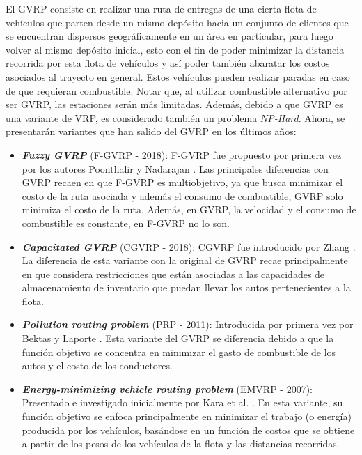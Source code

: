 \documentclass[letter, 10pt]{article}
\begin{document}
El GVRP consiste en realizar una ruta de entregas de una cierta flota de vehículos que parten desde un mismo depósito hacia un conjunto de clientes que se encuentran dispersos geográficamente en un área en particular, para luego volver al mismo depósito inicial, esto con el fin de poder minimizar la distancia recorrida por esta flota de vehículos y así poder también abaratar los costos asociados al trayecto en general. Estos vehículos pueden realizar paradas en caso de que requieran combustible. Notar que, al utilizar combustible alternativo por ser GVRP, las estaciones serán más limitadas. Además, debido a que GVRP es una variante de VRP, es considerado también un problema \emph{NP-Hard}. Ahora, se presentarán variantes que han salido del GVRP en los últimos años:\\
\begin{itemize}
    \item \textbf{\emph{Fuzzy GVRP}} (F-GVRP - 2018): F-GVRP fue propuesto por primera vez por los autores Poonthalir y Nadarajan \cite{FGVRP}. Las principales diferencias con GVRP recaen en que F-GVRP es multiobjetivo, ya que busca minimizar el costo de la ruta asociada y además el consumo de combustible, GVRP solo minimiza el costo de la ruta. Además, en GVRP, la velocidad y el consumo de combustible es constante, en F-GVRP no lo son.

    \item \textbf{\emph{Capacitated GVRP}} (CGVRP - 2018): CGVRP fue introducido por Zhang \cite{CGVRP}. La diferencia de esta variante con la original de GVRP recae principalmente en que considera restricciones que están asociadas a las capacidades de almacenamiento de inventario que puedan llevar los autos pertenecientes a la flota.
    
    \item \textbf{\emph{Pollution routing problem}} (PRP - 2011): Introducida por primera vez por Bektas y Laporte \cite{PRP}. Esta variante del GVRP se diferencia debido a que la función objetivo se concentra en minimizar el gasto de combustible de los autos y el costo de los conductores. 
    
    \item \textbf{\emph{Energy-minimizing vehicle routing problem}} (EMVRP - 2007): Presentado e investigado inicialmente por Kara et al. \cite{EMVRP}. En esta variante, su función objetivo se enfoca principalmente en minimizar el trabajo (o energía) producida por los vehículos, basándose en un función de costos que se obtiene a partir de los pesos de los vehículos de la flota y las distancias recorridas.

\end{itemize}
\\
\end{document}
